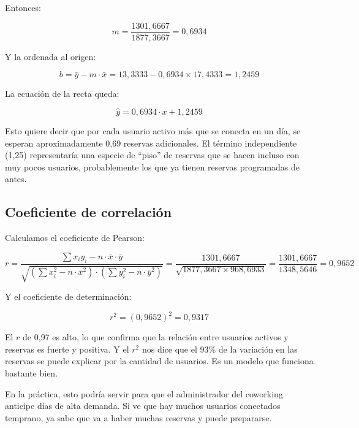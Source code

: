 \documentclass[12pt,a4paper]{article}
\begin{document}
Entonces:

$$m = \frac{1301{,}6667}{1877{,}3667} = 0{,}6934$$

\vspace{6pt}
Y la ordenada al origen:

$$b = \bar{y} - m \cdot \bar{x} = 13{,}3333 - 0{,}6934 \times 17{,}4333 = 1{,}2459$$
\vspace{4pt}

La ecuación de la recta queda:

\vspace{4pt}
$$\boxed{\hat{y} = 0{,}6934 \cdot x + 1{,}2459}$$
\vspace{4pt}

Esto quiere decir que por cada usuario activo más que se conecta en un día, se esperan aproximadamente 0,69 reservas adicionales. El término independiente (1,25) representaría una especie de ``piso'' de reservas que se hacen incluso con muy pocos usuarios, probablemente los que ya tienen reservas programadas de antes.

\subsection{Coeficiente de correlación}

Calculamos el coeficiente de Pearson:

\vspace{4pt}
$$r = \frac{\sum x_i y_i - n \cdot \bar{x} \cdot \bar{y}}{\sqrt{\left(\sum x_i^2 - n \cdot \bar{x}^2\right) \cdot \left(\sum y_i^2 - n \cdot \bar{y}^2\right)}} = \frac{1301{,}6667}{\sqrt{1877{,}3667 \times 968{,}6933}} = \frac{1301{,}6667}{1348{,}5646} = 0{,}9652$$
\vspace{4pt}

Y el coeficiente de determinación:

\vspace{4pt}
$$r^2 = (0{,}9652)^2 = 0{,}9317$$
\vspace{4pt}

El $r$ de 0,97 es alto, lo que confirma que la relación entre usuarios activos y reservas es fuerte y positiva. Y el $r^2$ nos dice que el 93\% de la variación en las reservas se puede explicar por la cantidad de usuarios. Es un modelo que funciona bastante bien.

En la práctica, esto podría servir para que el administrador del coworking anticipe días de alta demanda. Si ve que hay muchos usuarios conectados temprano, ya sabe que va a haber muchas reservas y puede prepararse.
\end{document}
